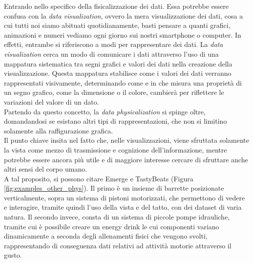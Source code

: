 \documentclass[12pt,a4paper]{report}
\begin{document}
Entrando nello specifico della fisicalizzazione dei dati. Essa potrebbe essere confusa con la \textit{data visualization}, ovvero la mera visualizzazione dei dati, cosa a cui tutti noi siamo abituati quotidianamente, basti pensare a quanti grafici, animazioni e numeri vediamo ogni giorno sui nostri smartphone o computer. In effetti, entrambe si riferiscono a modi per rappresentare dei dati. La \textit{data visualization} cerca un modo di comunicare i dati attraverso l'uso di una mappatura sistematica tra segni grafici e valori dei dati nella creazione della visualizzazione. Questa mappatura stabilisce come i valori dei dati verranno rappresentati visivamente, determinando come e in che misura una proprietà di un segno grafico, come la dimensione o il colore, cambierà per riflettere le variazioni del valore di un dato.\\
Partendo da questo concetto, la \textit{data physicalization} si spinge oltre\cite{jansen2015opportunities}, domandandosi se esistano altri tipi di rappresentazioni, che non si limitino solamente alla raffigurazione grafica. \\
Il punto chiave insita nel fatto che, nelle visualizzazioni, viene sfruttata solamente la vista come mezzo di trasmissione e cognizione dell'informazione, mentre potrebbe essere ancora più utile e di maggiore interesse cercare di sfruttare anche altri sensi del corpo umano.\\
A tal proposito, si possono citare Emerge \cite{emergePhysicalPlot} e TastyBeats \cite{tastybeats} (Figura \ref{fig:examples_other_phys}). Il primo è un insieme di barrette posizionate verticalmente, sopra un sistema di pistoni motorizzati, che permettono di vedere e interagire, tramite quindi l'uso della vista e del tatto, con dei dataset di varia natura. Il secondo invece, consta di un sistema di piccole pompe idrauliche, tramite cui è possibile creare un energy drink le cui componenti variano dinamicamente a seconda degli allenamenti fisici che vengono svolti, rappresentando di conseguenza dati relativi ad attività motorie attraverso il gusto.\\
\end{document}
